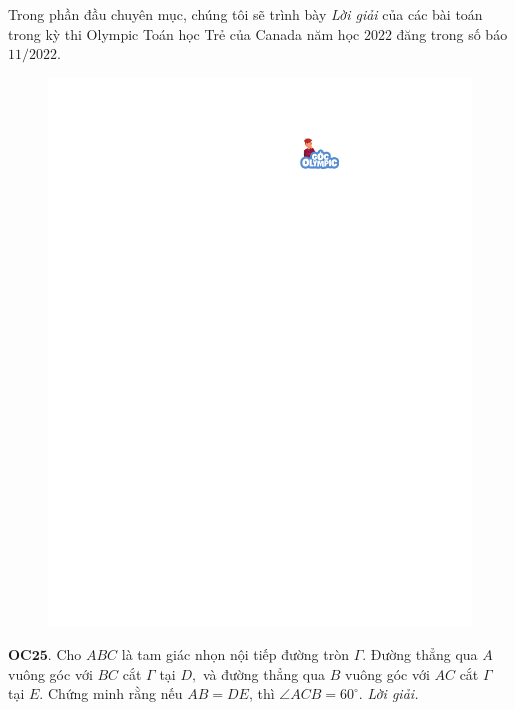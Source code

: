 \centering
\endgroup
\vspace*{10pt}
\begin{multicols}{2}
	Trong phần đầu chuyên mục, chúng tôi sẽ trình bày \textit{Lời giải} của các bài toán trong kỳ thi  Olympic Toán học Trẻ của Canada năm học $2022$  đăng trong số báo $11/2022$. 
	\begin{figure}[H]
		\centering
		\vspace*{-5pt}
		\captionsetup{labelformat= empty, justification=centering}
		\includegraphics[width=1\linewidth]{gocolympic}
		\vspace*{-10pt}
	\end{figure}
	{\bf\color{cackithi} OC$\pmb{25.}$} Cho $ABC$ là tam giác nhọn nội tiếp đường tròn $\Gamma.$ Đường thẳng qua $A$ vuông góc với $BC$ cắt $\Gamma$ tại $D,$ và đường thẳng qua $B$ vuông góc với $AC$ cắt $\Gamma$ tại $E.$ Chứng minh rằng nếu $AB = DE$, thì $\angle ACB = 60^{\circ}.$
	\vskip 0.1cm
	\textit{\textit{Lời giải}.} 
	\begin{figure}[H]

\end{figure}
\end{multicols}
